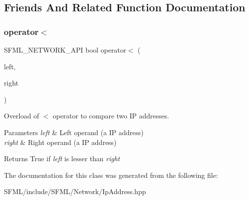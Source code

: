 \subsection{Friends And Related Function Documentation}
\mbox{\label{classsf_1_1_ip_address_a1c4ae6b26e9df765ca57d2715e9a7885}} 
\subsubsection{\texorpdfstring{operator$<$}{operator<}}
{\footnotesize\ttfamily S\+F\+M\+L\+\_\+\+N\+E\+T\+W\+O\+R\+K\+\_\+\+A\+PI bool operator$<$ (\begin{DoxyParamCaption}\item[{const \mbox{\hyperlink{classsf_1_1_ip_address}{Ip\+Address}} \&}]{left,  }\item[{const \mbox{\hyperlink{classsf_1_1_ip_address}{Ip\+Address}} \&}]{right }\end{DoxyParamCaption})\hspace{0.3cm}{\ttfamily [friend]}}



Overload of $<$ operator to compare two IP addresses. 


\begin{DoxyParams}{Parameters}
{\em left} & Left operand (a IP address) \\
\hline
{\em right} & Right operand (a IP address)\\
\hline
\end{DoxyParams}
\begin{DoxyReturn}{Returns}
True if {\itshape left} is lesser than {\itshape right} \begin{DoxyVerb}\end{DoxyVerb}
 
\end{DoxyReturn}


The documentation for this class was generated from the following file\+:\begin{DoxyCompactItemize}
\item 
S\+F\+M\+L/include/\+S\+F\+M\+L/\+Network/Ip\+Address.\+hpp\end{DoxyCompactItemize}
